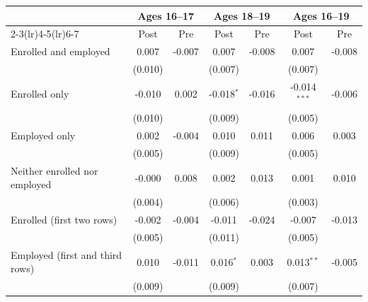 \begin{tabular}{lcccccc}
\toprule
 & \multicolumn{2}{c}{Ages 16--17} & \multicolumn{2}{c}{Ages 18--19} & \multicolumn{2}{c}{Ages 16--19} \\
\cmidrule(lr){2-3}\cmidrule(lr){4-5}\cmidrule(lr){6-7}
 & Post & Pre & Post & Pre & Post & Pre \\
\midrule
Enrolled and employed & 0.007 & -0.007 & 0.007 & -0.008 & 0.007 & -0.008 \\
 & (0.010) &  & (0.007) &  & (0.007) &  \\
Enrolled only & -0.010 & 0.002 & -0.018$^{*}$ & -0.016 & -0.014$^{***}$ & -0.006 \\
 & (0.010) &  & (0.009) &  & (0.005) &  \\
Employed only & 0.002 & -0.004 & 0.010 & 0.011 & 0.006 & 0.003 \\
 & (0.005) &  & (0.009) &  & (0.005) &  \\
Neither enrolled nor employed & -0.000 & 0.008 & 0.002 & 0.013 & 0.001 & 0.010 \\
 & (0.004) &  & (0.006) &  & (0.003) &  \\
Enrolled (first two rows) & -0.002 & -0.004 & -0.011 & -0.024 & -0.007 & -0.013 \\
 & (0.005) &  & (0.011) &  & (0.005) &  \\
Employed (first and third rows) & 0.010 & -0.011 & 0.016$^{*}$ & 0.003 & 0.013$^{**}$ & -0.005 \\
 & (0.009) &  & (0.009) &  & (0.007) &  \\
\bottomrule
\end{tabular}
